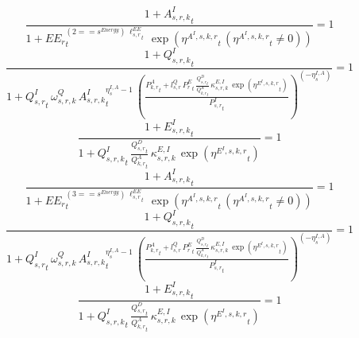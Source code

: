 \noindent[name= `productivity of intermediates in subsector 1 region 1 from sector 2']
\begin{dmath}
\frac{1+{{A^{I}_{s,r,k}}}_{t}}{1+{{EE_r}}_{t}^{\left(2=={{s^{Energy}}}\right)\, {{\ell^{EE}_{s,r}}}_{t}}\, \exp\left({{\eta^{A^{I},s,k,r}}}_{t}\, \left({{\eta^{A^{I},s,k,r}}}_{t}\neq 0\right)\right)}=1
\end{dmath}
\noindent[name= `regional sector demand for intermediates from aggregate sector 1 1 3']
\begin{dmath}
\frac{1+{{Q^{I}_{s,r,k}}}_{t}}{1+{{Q^{I}_{s,r}}}_{t}\, {{\omega^{Q}_{s,r,k}}}\, {{A^{I}_{s,r,k}}}_{t}^{{{\eta^{I,A}_{s}}}-1}\, \left(\frac{{{P^{A}_{k,r}}}_{t}+{{l^{Q}_{s,r}}}\, {{P^E_r}}_{t}\, \frac{{{Q^{D}_{s,r}}}_{t}}{{{Q^{A}_{k,r}}}_{t}}\, {{\kappa^{E,I}_{s,r,k}}}\, \exp\left({{\eta^{E^{I},s,k,r}}}_{t}\right)}{{{P^{I}_{s,r}}}_{t}}\right)^{\left(-{{\eta^{I,A}_{s}}}\right)}}=1
\end{dmath}
\noindent[name= `regional emissions caused by using intermediates from aggregate sector 1 1 3']
\begin{dmath}
\frac{1+{{E^I_{s,r,k}}}_{t}}{1+{{Q^{I}_{s,r,k}}}_{t}\, \frac{{{Q^{D}_{s,r}}}_{t}}{{{Q^{A}_{k,r}}}_{t}}\, {{\kappa^{E,I}_{s,r,k}}}\, \exp\left({{\eta^{E^{I},s,k,r}}}_{t}\right)}=1
\end{dmath}
\noindent[name= `productivity of intermediates in subsector 1 region 1 from sector 3']
\begin{dmath}
\frac{1+{{A^{I}_{s,r,k}}}_{t}}{1+{{EE_r}}_{t}^{\left(3=={{s^{Energy}}}\right)\, {{\ell^{EE}_{s,r}}}_{t}}\, \exp\left({{\eta^{A^{I},s,k,r}}}_{t}\, \left({{\eta^{A^{I},s,k,r}}}_{t}\neq 0\right)\right)}=1
\end{dmath}
\noindent[name= `regional sector demand for intermediates from aggregate sector 1 1 4']
\begin{dmath}
\frac{1+{{Q^{I}_{s,r,k}}}_{t}}{1+{{Q^{I}_{s,r}}}_{t}\, {{\omega^{Q}_{s,r,k}}}\, {{A^{I}_{s,r,k}}}_{t}^{{{\eta^{I,A}_{s}}}-1}\, \left(\frac{{{P^{A}_{k,r}}}_{t}+{{l^{Q}_{s,r}}}\, {{P^E_r}}_{t}\, \frac{{{Q^{D}_{s,r}}}_{t}}{{{Q^{A}_{k,r}}}_{t}}\, {{\kappa^{E,I}_{s,r,k}}}\, \exp\left({{\eta^{E^{I},s,k,r}}}_{t}\right)}{{{P^{I}_{s,r}}}_{t}}\right)^{\left(-{{\eta^{I,A}_{s}}}\right)}}=1
\end{dmath}
\noindent[name= `regional emissions caused by using intermediates from aggregate sector 1 1 4']
\begin{dmath}
\frac{1+{{E^I_{s,r,k}}}_{t}}{1+{{Q^{I}_{s,r,k}}}_{t}\, \frac{{{Q^{D}_{s,r}}}_{t}}{{{Q^{A}_{k,r}}}_{t}}\, {{\kappa^{E,I}_{s,r,k}}}\, \exp\left({{\eta^{E^{I},s,k,r}}}_{t}\right)}=1
\end{dmath}
